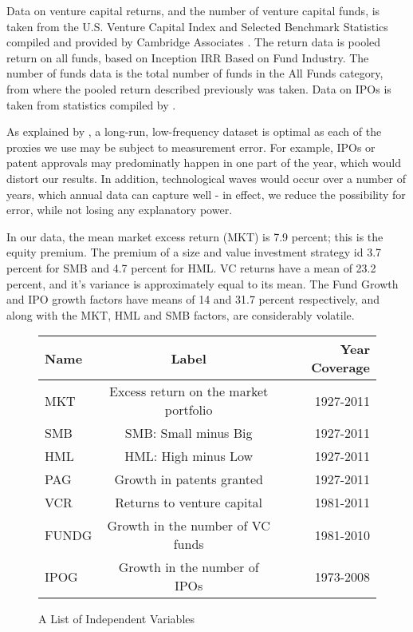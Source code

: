 \documentclass[12pt]{article}
\begin{document}
Data on venture capital returns, and the number of venture capital funds, is taken from the U.S. Venture Capital Index and Selected Benchmark Statistics compiled and provided by Cambridge Associates \cite{cambridge_vc_index}. The return data is pooled return on all funds, based on Inception IRR Based on Fund Industry. The number of funds data is the total number of funds in the All Funds category, from where the pooled return described previously was taken. Data on IPOs is taken from statistics compiled by \cite{ritter_ipo_index}.

As explained by \citet{grammign2010}, a long-run, low-frequency dataset is optimal as each of the proxies we use may be subject to measurement error. For example, IPOs or patent approvals may predominatly happen in one part of the year, which would distort our results. In addition, technological waves would occur over a number of years, which annual data can capture well - in effect, we reduce the possibility for error, while not losing any explanatory power.

In our data, the mean market excess return (MKT) is 7.9 percent; this is the equity premium. The premium of a size and value investment strategy id 3.7 percent for SMB and 4.7 percent for HML. VC returns have a mean of 23.2 percent, and it's variance is approximately equal to its mean. The Fund Growth and IPO growth factors have means of 14 and 31.7 percent respectively, and along with the MKT, HML and SMB factors, are considerably volatile.




\begin{figure}

\caption{A List of Independent Variables}

\begin{tabular}{|l|c|r|}

\hline
	Name & Label & Year Coverage\\
\hline
MKT			&  Excess return on the market portfolio & 1927-2011\\
SMB				&  SMB: Small minus Big & 1927-2011\\
HML				&  HML: High minus Low & 1927-2011\\
PAG			&  Growth in patents granted & 1927-2011\\
VCR		&  Returns to venture capital & 1981-2011\\
FUNDG		&  Growth in the number of VC funds & 1981-2010\\
IPOG			&  Growth in the number of IPOs & 1973-2008 \\
	
\hline
\end{tabular}
\end{figure}
\end{document}
